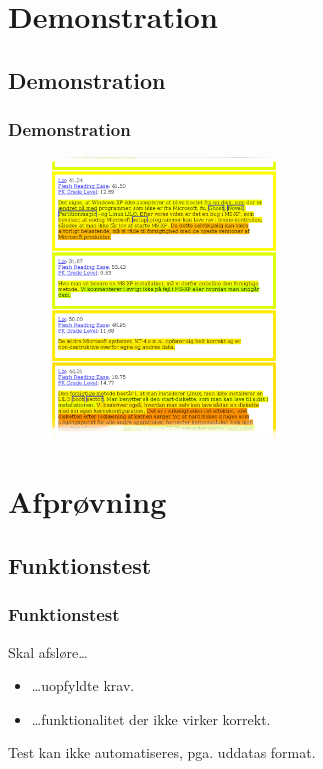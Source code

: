 \documentclass{beamer}
\begin{document}
\section{Demonstration}
\subsection{Demonstration}
\begin{frame}
  \frametitle{Demonstration}
  \begin{figure}
    \includegraphics[width=0.55\textwidth]{webanalyzeroutput.pdf}
  \end{figure}
\end{frame}

\section{Afprøvning}
\subsection{Funktionstest}
\begin{frame}
  \frametitle{Funktionstest}

  \begin{block}{Skal afsløre\dots}
    \begin{itemize}
    \item \dots uopfyldte krav.
    \item \dots funktionalitet der ikke virker korrekt.
    \end{itemize}
  \end{block}

  Test kan ikke automatiseres, pga. uddatas format.

\end{frame}
\end{document}
